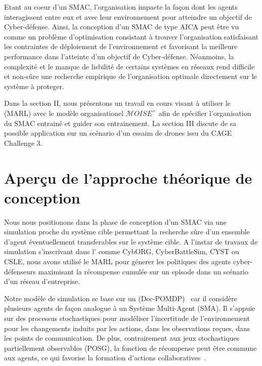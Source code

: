 \documentclass[conference]{IEEEtran}
\begin{document}
Etant au coeur d'un SMAC, l'organisation impacte la façon dont les agents interagissent entre eux et avec leur environnement pour atteindre un objectif de Cyber-défense. Ainsi, la conception d'un SMAC de type AICA peut être vu comme un problème d'optimisation consistant à trouver l'organisation satisfaisant les contraintes de déploiement de l'environnement et favorisant la meilleure performance dans l'atteinte d'un objectif de Cyber-défense.
Néanmoins, la complexité et le manque de lisbilité de certains systèmes en réseaux rend difficile et non-sûre une recherche empirique de l'organisation optimale directement sur le système à proteger.

Dans la section II, nous présentons un travail en cours visant à utiliser le  (MARL) avec le modèle organisationel $\mathcal{M}OISE^{+}$\cite{Hubner2002} afin de spécifier l'organisation du SMAC entrainé et guider son entrainement.
La section III discute de sa possible application sur un scénario d'un essaim de drones issu du CAGE Challenge 3\cite{cage_challenge_3_announcement2022}.

\section{Aperçu de l'approche théorique de conception}

Nous nous positionons dans la phase de conception d'un SMAC via une simulation proche du système cible permettant la recherche sûre d'un ensemble d'agent éventuellement transferables sur le système cible. A l'instar de travaux de simulation s'inscrivant dans l' comme CybORG\cite{Maxwell2021}, CyberBattleSim\cite{cyberbattlesim}, CYST\cite{drasar_session-level_2020} ou CSLE\cite{Hammar2022}, nous avons utilisé le MARL pour génerer les politiques des agents cyber-défenseurs maximisant la récompense cumulée sur un episode dans un scénario d'un réseau d'entreprise\cite{soule2023towards}.

Notre modèle de simulation se base sur un  (Dec-POMDP)~\cite{Oliehoek2016} car il considère plusieurs agents de façon analogue à un Système Multi-Agent (SMA). Il s'appuie sur des processus stochastiques pour modéliser l'incertitude de l'environnement pour les changements induits par les actions, dans les observations reçues, dans les points de communication. De plus, contrairement aux jeux stochastiques partiellement observables (POSG), la fonction de récompense peut être commune aux agents, ce qui favorise la formation d'actions collaboratives~\cite{Beynier2013}.
\end{document}
